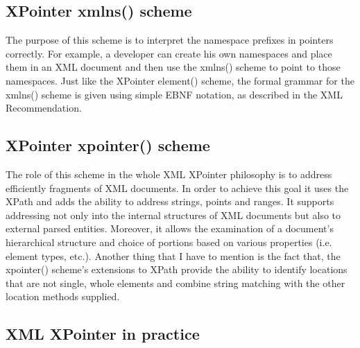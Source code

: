 \documentclass[11pt]{article}
\begin{document}
\subsection{XPointer xmlns() scheme}

The purpose of this scheme is to interpret the namespace prefixes in pointers correctly. For example, a developer can create his own namespaces and place them in an XML document and then use the xmlns() scheme to point to those namespaces. Just like the XPointer element() scheme, the formal grammar for the xmlns() scheme is given using simple EBNF notation, as described in the XML Recommendation.\cite{xmlnsscheme} 

\subsection{XPointer xpointer() scheme}

The role of this scheme in the whole XML XPointer philosophy is to address efficiently fragments of XML documents. In order to achieve this goal it uses the XPath and adds the ability to address strings, points and ranges. It supports addressing not only into the internal structures of XML documents but also to external parsed entities. Moreover, it allows the examination of a document's hierarchical structure and choice of portions based on various properties (i.e. element types, etc.). Another thing that I have to mention is the fact that, the xpointer() scheme's extensions to XPath provide the ability to identify locations that are not single, whole elements and combine string matching with the other location methods supplied.\cite{xpointerscheme}

\subsection{XML XPointer in practice}
\end{document}
